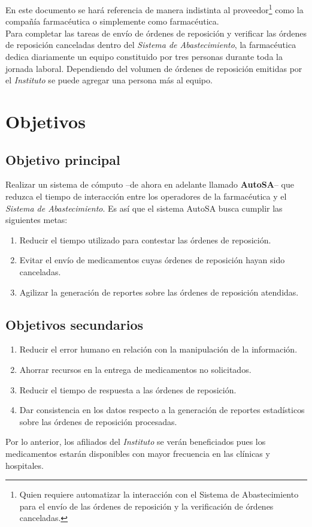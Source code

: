 En este documento se hará referencia de manera indistinta al proveedor\footnote{Quien requiere automatizar la interacción con el Sistema de Abastecimiento para el envío de las órdenes de reposición y la verificación de órdenes canceladas.} como la compañía farmacéutica o simplemente como farmacéutica.\\
Para completar las tareas de envío de órdenes de reposición y verificar las órdenes de reposición canceladas dentro del \textit{Sistema de Abastecimiento}, la farmacéutica dedica diariamente un equipo constituido por tres personas durante toda la jornada laboral. Dependiendo del volumen de órdenes de reposición emitidas por el \textit{Instituto} se puede agregar una persona más al equipo.

\section{Objetivos}
\subsection{Objetivo principal}\label{sec:objetivo-principal}
Realizar un sistema de cómputo --de ahora en adelante llamado \textbf{AutoSA}-- que reduzca el tiempo de interacción entre los operadores de la farmacéutica y el \textit{Sistema de Abastecimiento}. Es así que el sistema AutoSA busca cumplir las siguientes metas:
\begin{enumerate}
	\item Reducir el tiempo utilizado para contestar las órdenes de reposición.
	\item Evitar el envío de medicamentos cuyas órdenes de reposición hayan sido canceladas.
	\item Agilizar la generación de reportes sobre las órdenes de reposición atendidas.
\end{enumerate}

\subsection{Objetivos secundarios}\label{sec:objetivos-secundarios}
\begin{enumerate}
\item Reducir el error humano en relación con la manipulación de la información.
\item Ahorrar recursos en la entrega de medicamentos no solicitados.
\item Reducir el tiempo de respuesta a las órdenes de reposición.
\item Dar consistencia en los datos respecto a la generación de reportes estadísticos sobre las órdenes de reposición procesadas.
\end{enumerate}
Por lo anterior, los afiliados del \textit{Instituto} se verán beneficiados pues los medicamentos estarán disponibles con mayor frecuencia en las clínicas y hospitales.

